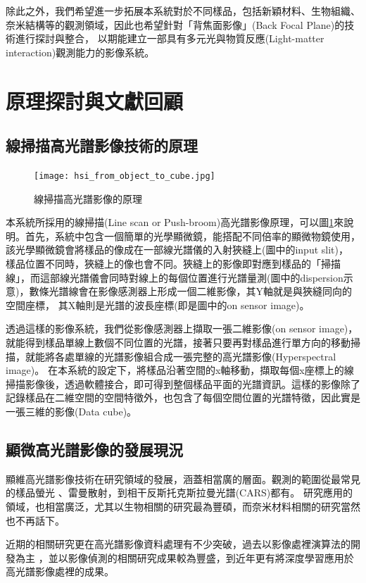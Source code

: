 \documentclass[12pt]{article}
\begin{document}
除此之外，我們希望進一步拓展本系統對於不同樣品，包括新穎材料、生物組織、奈米結構等的觀測領域，因此也希望針對「背焦面影像」(Back Focal Plane)的技術進行探討與整合，
以期能建立一部具有多元光與物質反應(Light-matter interaction)觀測能力的影像系統。

\section{原理探討與文獻回顧}
\subsection{線掃描高光譜影像技術的原理}
\begin{figure}[h]
    \centering
    \texttt{[image: hsi\_from\_object\_to\_cube.jpg]}
    \caption{線掃描高光譜影像的原理}
    \label{fromObjecttoCube}
\end{figure}
本系統所採用的線掃描(Line scan or Push-broom)高光譜影像原理，可以圖\ref{fromObjecttoCube}來說明。首先，系統中包含一個簡單的光學顯微鏡，能搭配不同倍率的顯微物鏡使用，該光學顯微鏡會將樣品的像成在一部線光譜儀的入射狹縫上(圖中的input slit)，
樣品位置不同時，狹縫上的像也會不同。狹縫上的影像即對應到樣品的「掃描線」，而這部線光譜儀會同時對線上的每個位置進行光譜量測(圖中的dispersion示意)，數條光譜線會在影像感測器上形成一個二維影像，其Y軸就是與狹縫同向的空間座標，
其X軸則是光譜的波長座標(即是圖中的on sensor image)。

透過這樣的影像系統，我們從影像感測器上擷取一張二維影像(on sensor image)，就能得到樣品單線上數個不同位置的光譜，接著只要再對樣品進行單方向的移動掃描，就能將各處單線的光譜影像組合成一張完整的高光譜影像(Hyperspectral image)。
在本系統的設定下，將樣品沿著空間的x軸移動，擷取每個x座標上的線掃描影像後，透過軟體接合，即可得到整個樣品平面的光譜資訊。這樣的影像除了記錄樣品在二維空間的空間特徵外，也包含了每個空間位置的光譜特徵，因此實是一張三維的影像(Data cube)。

\subsection{顯微高光譜影像的發展現況}
顯維高光譜影像技術在研究領域的發展，涵蓋相當廣的層面。觀測的範圍從最常見的樣品螢光
、雷曼散射，到相干反斯托克斯拉曼光譜(CARS)都有\cite{roth2015hyperspectral,zhang2013quantitative, pegoraro2014hyperspectral}。
研究應用的領域，也相當廣泛，尤其以生物相關的研究最為豐碩\cite{leavesley2012hyperspectral,studer2012compressive}，而奈米材料相關的研究當然也不再話下\cite{roth2015hyperspectral}。

近期的相關研究更在高光譜影像資料處理有不少突破，過去以影像處裡演算法的開發為主
\cite{manolakis2002detection,nascimento2005vertex}
，並以影像偵測的相關研究成果較為豐盛\cite{manolakis2009there}，到近年更有將深度學習應用於高光譜影像處裡的成果\cite{chen2014deep}。
\end{document}
